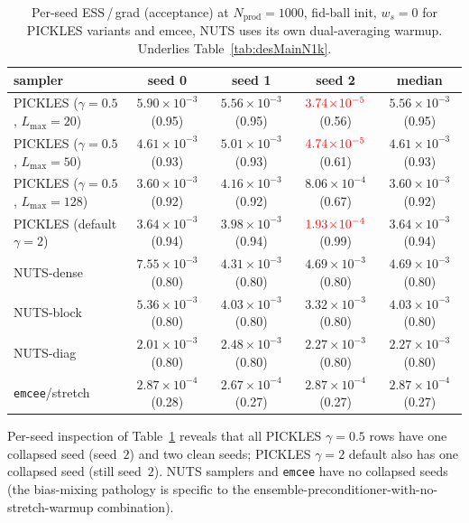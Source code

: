 \documentclass{article}
\begin{document}
\begin{table}[h]
\centering
\caption{Per-seed ESS\,/\,grad (acceptance) at $N_{\text{prod}}=1000$,
fid-ball init, $w_s=0$ for PICKLES variants and emcee, NUTS uses its own
dual-averaging warmup.  Underlies Table~\ref{tab:desMainN1k}.}
\label{tab:desPerSeedMainN1k}
\small
\setlength{\tabcolsep}{4pt}
\begin{tabular}{l c c c c}
\toprule
sampler & seed 0 & seed 1 & seed 2 & median \\
\midrule
PICKLES ($\gamma{=}0.5$, $L_{\max}{=}20$)  & $5.90\!\times\!10^{-3}$ (0.95) & $5.56\!\times\!10^{-3}$ (0.95) & $\textcolor{red}{3.74\!\times\!10^{-5}}$ (0.56) & $5.56\!\times\!10^{-3}$ (0.95) \\
PICKLES ($\gamma{=}0.5$, $L_{\max}{=}50$)  & $4.61\!\times\!10^{-3}$ (0.93) & $5.01\!\times\!10^{-3}$ (0.93) & $\textcolor{red}{4.74\!\times\!10^{-5}}$ (0.61) & $4.61\!\times\!10^{-3}$ (0.93) \\
PICKLES ($\gamma{=}0.5$, $L_{\max}{=}128$) & $3.60\!\times\!10^{-3}$ (0.92) & $4.16\!\times\!10^{-3}$ (0.92) & $8.06\!\times\!10^{-4}$ (0.67) & $3.60\!\times\!10^{-3}$ (0.92) \\
PICKLES (default $\gamma{=}2$)             & $3.64\!\times\!10^{-3}$ (0.94) & $3.98\!\times\!10^{-3}$ (0.94) & $\textcolor{red}{1.93\!\times\!10^{-4}}$ (0.99) & $3.64\!\times\!10^{-3}$ (0.94) \\
\midrule
NUTS-dense  & $7.55\!\times\!10^{-3}$ (0.80) & $4.31\!\times\!10^{-3}$ (0.80) & $4.69\!\times\!10^{-3}$ (0.80) & $4.69\!\times\!10^{-3}$ (0.80) \\
NUTS-block  & $5.36\!\times\!10^{-3}$ (0.80) & $4.03\!\times\!10^{-3}$ (0.80) & $3.32\!\times\!10^{-3}$ (0.80) & $4.03\!\times\!10^{-3}$ (0.80) \\
NUTS-diag   & $2.01\!\times\!10^{-3}$ (0.80) & $2.48\!\times\!10^{-3}$ (0.80) & $2.27\!\times\!10^{-3}$ (0.80) & $2.27\!\times\!10^{-3}$ (0.80) \\
\texttt{emcee}/stretch & $2.87\!\times\!10^{-4}$ (0.28) & $2.67\!\times\!10^{-4}$ (0.27) & $2.87\!\times\!10^{-4}$ (0.27) & $2.87\!\times\!10^{-4}$ (0.27) \\
\bottomrule
\end{tabular}
\end{table}

Per-seed inspection of Table~\ref{tab:desPerSeedMainN1k} reveals that
all PICKLES $\gamma=0.5$ rows have one collapsed seed (seed~$2$) and
two clean seeds; PICKLES $\gamma=2$ default also has one collapsed
seed (still seed~$2$).  NUTS samplers and \texttt{emcee} have no
collapsed seeds (the bias-mixing pathology is specific to the
ensemble-preconditioner-with-no-stretch-warmup combination).
\end{document}
